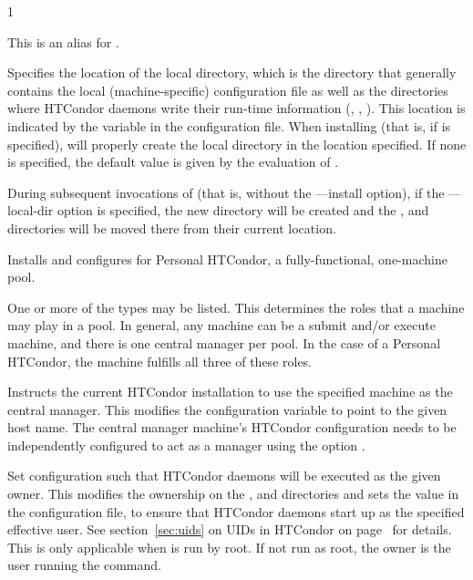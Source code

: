 \begin{ManPage}{\label{man-condor-configure}}{1}
\begin{Options}
   {This is an alias for
    .}

   {Specifies the
    location of the local directory, which is the directory that generally 
    contains the local (machine-specific) configuration file as well as the
    directories where HTCondor daemons write their run-time information 
    (, , ).
    This location is indicated  by the  
    variable in the configuration file. 
    When installing (that is, if  is specified),
    will properly create the local directory in the location specified.
    If none is specified, the default value is given by the evaluation of
    .

    During subsequent invocations of 
    (that is, without the ---install option),
    if the ---local-dir option is specified, the new directory
    will be created and the ,  and  
    directories will be moved there from their current location.}

   {Installs and configures for 
     Personal HTCondor, a fully-functional, one-machine pool.}

   {One
    or more of the types may be listed.
    This determines the roles that a machine may play in a pool.
    In general, any machine can be a submit and/or execute machine,
    and there is one central manager per pool.
    In the case of a Personal HTCondor,
    the machine fulfills all three of these roles.}

   {Instructs
    the current HTCondor installation to use the specified machine
    as the central manager. 
    This modifies the configuration variable 
    to point to the given host name.
    The central manager machine's HTCondor configuration needs
    to be independently configured to 
    act as a manager using the option . }

   {Set configuration
    such that HTCondor daemons will be executed as the given owner.
    This modifies the 
    ownership on the ,  and 
    directories and sets the  value
    in the configuration file,
    to ensure that HTCondor daemons start up as the specified effective user.
    See section~\ref{sec:uids} on
    UIDs in HTCondor on page~\pageref{sec:uids} for details.
    This is only applicable when  is run by root.
    If not run as root, the owner is the user running
    the  command.  }


\end{Options}
\end{ManPage}
